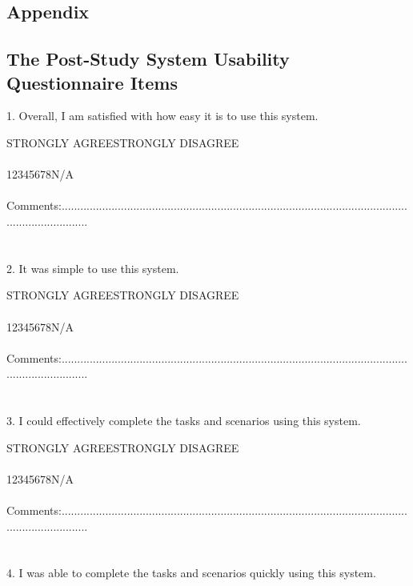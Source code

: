\newpage
\newcommand{\tab}{\hspace*{4em}}
\begin{appendix}
\section{Appendix}
\subsection{The Post-Study System Usability Questionnaire Items}
\label{appendix:post_study_questionnaire}
{\parindent0pt

1. Overall, I am satisfied with how easy it is to use this system.

STRONGLY AGREE\tab\tab\tab\tab\tab STRONGLY DISAGREE\\
\\
\tab1\tab2\tab3\tab4\tab5\tab6\tab7\tab8\tab\tab N/A\\
\\
Comments:.........................................................................................................................................\\
\\
\\
2. It was simple to use this system.

STRONGLY AGREE\tab\tab\tab\tab\tab STRONGLY DISAGREE\\
\\
\tab1\tab2\tab3\tab4\tab5\tab6\tab7\tab8\tab\tab N/A\\
\\
Comments:.........................................................................................................................................\\
\\
\\
3. I could effectively complete the tasks and scenarios using this system.

STRONGLY AGREE\tab\tab\tab\tab\tab STRONGLY DISAGREE\\
\\
\tab1\tab2\tab3\tab4\tab5\tab6\tab7\tab8\tab\tab N/A\\
\\
Comments:.........................................................................................................................................\\
\\
\\
4. I was able to complete the tasks and scenarios quickly using this system.

}
\end{appendix}
